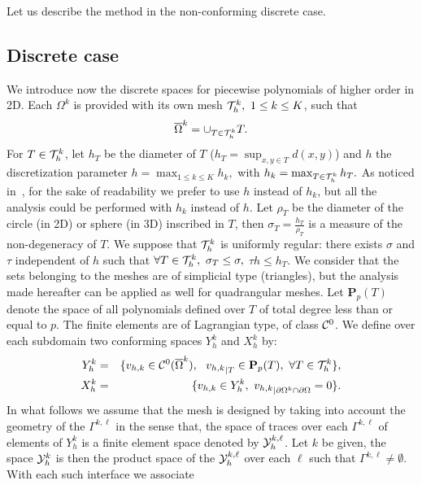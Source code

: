 \documentclass[final]{siamltex}
\begin{document}
Let us describe the method in the non-conforming discrete case.
\subsection{Discrete case}\label{sec.discretecasepb}
We  introduce now the discrete spaces for piecewise polynomials of higher order
in 2D. Each $\Omega^k$ is provided with
its own mesh ${\cal T}_h^k, \ 1 \le k \le K$, such that
\begin{eqnarray}
\overline \Omega^k=\cup_{T \in {\cal T}_h^k} T. \nonumber
\end{eqnarray}
For $T \in {\cal T}_h^k$, let $h_T$ be the diameter of $T$
($h_T=\sup_{x,y \in T} d(x,y)$) and $h$ the discretization parameter
$h=\max_{1 \le k \le K} h_k,$ with $h_k=\max_{T \in {\cal T}_h^k} h_T.$
As noticed in~\cite{JMN10}, for the sake of readability we prefer to use
$h$ instead of $h_k$, but all the analysis could be performed with $h_k$ instead of $h$.
Let $\rho_T$ be the diameter of the  circle (in 2D) or
sphere (in 3D)
inscribed in $T$, then $\sigma_T=\frac{h_T}{\rho_T}$ is a measure of the
non-degeneracy of $T$. We suppose that ${\cal T}_h^k$ is uniformly regular:
there exists $\sigma$ and $\tau$ independent of $h$ such that
$\forall T \in {\cal T}_h^k, \ \sigma_T \le \sigma,$
$\tau h \le h_T .$
We consider that the sets belonging to the meshes are of simplicial type
(triangles), but
the analysis made hereafter can be applied as well for quadrangular meshes.
Let ${\mathbf{P}}_p(T)$ denote the space of all polynomials defined over $T$
of total degree less than or equal to $p$. 
The finite elements are of Lagrangian type, of class ${\cal C}^0$.
We define over each subdomain two conforming spaces $Y_h^k$ and
$X_h^k$ by:
\begin{eqnarray}
Y_h^k&=&\{v_{h,k} \in {\cal C}^0(\overline \Omega^k),
\ \  {v_{h,k}}_{|T} \in {\mathbf{P}}_p(T), \ \forall T \in {\cal T}_h^k \},
\nonumber\\
X_h^k&=&\{v_{h,k} \in Y_h^k, \  {v_{h,k}}_{|\partial \Omega^k \cap \partial
\Omega}=0\}.\nonumber
\end{eqnarray}
In what follows we assume that the mesh is designed by taking into
account the geometry of the $\Gamma^{k,\ell}$ in the sense that, the
space of traces over each $\Gamma^{k,\ell}$ of elements of $Y_h^k$ is
a finite element space denoted by ${\cal Y}_h^{k,\ell}$.  
Let $k$ be given, the space ${\cal Y}_h^k$ is then the product space of the
${\cal Y}_h^{k,\ell}$ over each $\ell$ such that
$\Gamma^{k,\ell}\not=\emptyset$. With each such interface we associate
\end{document}
